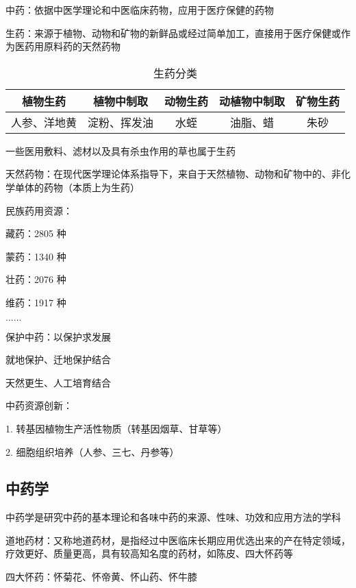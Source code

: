 \begin{defi}
    中药：依据中医学理论和中医临床药物，应用于医疗保健的药物
\end{defi}
\begin{defi}
    生药：来源于植物、动物和矿物的新鲜品或经过简单加工，直接用于医疗保健或作为医药用原料药的天然药物
\end{defi}
\begin{table}[htpb]
    \centering
    \caption{生药分类}
    \label{tab:生药分类}
    \begin{tabular}{ccccc}
    \toprule
    植物生药 & 植物中制取 & 动物生药 & 动植物中制取 & 矿物生药\\
    \midrule
    人参、洋地黄 & 淀粉、挥发油 & 水蛭 & 油脂、蜡 & 朱砂\\
    \bottomrule
    \end{tabular}
\end{table}
\begin{notation}
    一些医用敷料、滤材以及具有杀虫作用的草也属于生药
\end{notation}
\begin{defi}
    天然药物：在现代医学理论体系指导下，来自于天然植物、动物和矿物中的、非化学单体的药物（本质上为生药）
\end{defi}

民族药用资源：

藏药：2805 种

蒙药：1340 种

壮药：2076 种

维药：1917 种

$\ldots\ldots$
\begin{notation}
    保护中药：以保护求发展

    就地保护、迁地保护结合

    天然更生、人工培育结合
\end{notation}
\begin{notation}
    中药资源创新：

    1. 转基因植物生产活性物质（转基因烟草、甘草等）
    
    2. 细胞组织培养（人参、三七、丹参等）
\end{notation}
\subsection{中药学}%
\label{sub:中药学}
\begin{defi}
    中药学是研究中药的基本理论和各味中药的来源、性味、功效和应用方法的学科
\end{defi}
\begin{notation}
    道地药材：又称地道药材，是指经过中医临床长期应用优选出来的产在特定领域，疗效更好、质量更高，具有较高知名度的药材，如陈皮、四大怀药等
\end{notation}
\begin{notation}
    四大怀药：怀菊花、怀帝黄、怀山药、怀牛膝
\end{notation}

